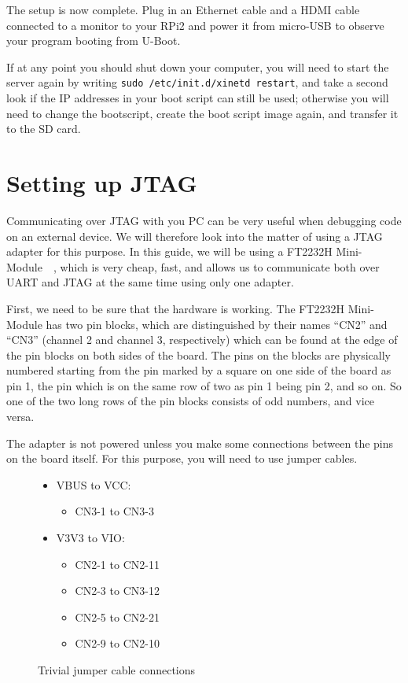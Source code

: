 \documentclass[a4paper,11pt,reqno]{amsart}
\begin{document}
The setup is now complete. Plug in an Ethernet cable and a HDMI cable connected to a monitor to your RPi2 and power it from micro-USB to observe your program booting from U-Boot.

If at any point you should shut down your computer, you will need to start the server again by writing \texttt{sudo /etc/init.d/xinetd restart}, and take a second look if the IP addresses in your boot script can still be used; otherwise you will need to change the bootscript, create the boot script image again, and transfer it to the SD card.

\section{Setting up JTAG}
Communicating over JTAG with you PC can be very useful when debugging code on an external device. We will therefore look into the matter of using a JTAG adapter for this purpose. In this guide, we will be using a FT2232H Mini-Module~\cite{ft2232h}~\cite{ft2232hmm}, which is very cheap, fast, and allows us to communicate both over UART and JTAG at the same time using only one adapter.

First, we need to be sure that the hardware is working. The FT2232H Mini-Module has two pin blocks, which are distinguished by their names ``CN2'' and ``CN3'' (channel 2 and channel 3, respectively) which can be found at the edge of the pin blocks on both sides of the board. The pins on the blocks are physically numbered starting from the pin marked by a square on one side of the board as pin 1, the pin which is on the same row of two as pin 1 being pin 2, and so on. So one of the two long rows of the pin blocks consists of odd numbers, and vice versa.

The adapter is not powered unless you make some connections between the pins on the board itself. For this purpose, you will need to use jumper cables.

\begin{figure}[hb]
\begin{center}
\begin{itemize}
\item VBUS to VCC:
		\begin{itemize}
		\item CN3-1 to CN3-3
		\end{itemize}
\item V3V3 to VIO:
		\begin{itemize}
		\item CN2-1 to CN2-11
		\item CN2-3 to CN3-12
		\item CN2-5 to CN2-21
		\item CN2-9 to CN2-10
		\end{itemize}
\end{itemize}
\end{center}
\caption{Trivial jumper cable connections}
\label{fig:con1}
\end{figure}
\end{document}
